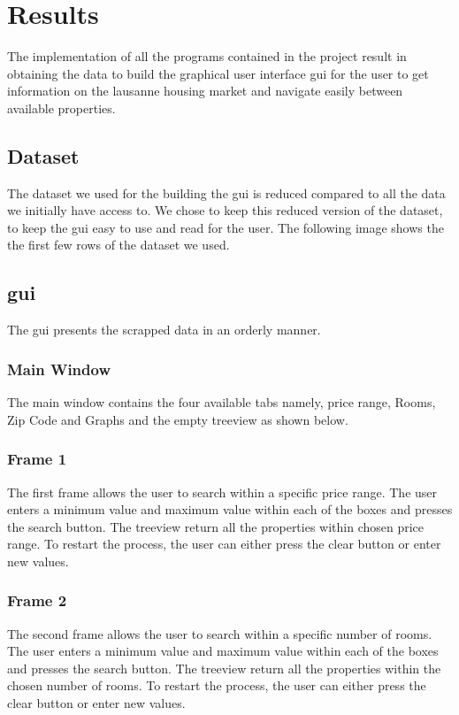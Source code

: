 \documentclass[main]{subfiles}
\begin{document}
\section{Results}
The implementation of all the programs contained in the project result in obtaining the data to build the graphical user interface \ac{gui} 
for the user to get information on the lausanne housing market and navigate easily between available properties.

\subsection{Dataset}
The dataset we used for the building the \ac{gui} is reduced compared to all the data we initially have access to. 
We chose to keep this reduced version of the dataset, to keep the \ac{gui} easy to use and read for the user. 
The following image shows the the first few rows of the dataset we used.

\subsection{\ac{gui}}
The \ac{gui} presents the scrapped data in an orderly manner.
\subsubsection{Main Window}
The main window contains the four available tabs namely, price range, Rooms, Zip Code and Graphs and the empty treeview as shown below.

\subsubsection{Frame 1}
The first frame allows the user to search within a specific price range. 
The user enters a minimum value and maximum value within each of the boxes and presses the search button. 
The treeview return all the properties within chosen price range. 
To restart the process, the user can either press the clear button or enter new values.

\subsubsection{Frame 2}
The second frame allows the user to search within a specific number of rooms. 
The user enters a minimum value and maximum value within each of the boxes and presses the search button. 
The treeview return all the properties within the chosen number of rooms. 
To restart the process, the user can either press the clear button or enter new values.
\end{document}
